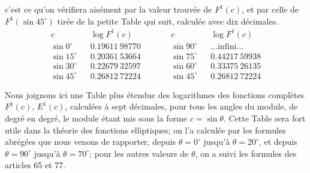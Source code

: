 \documentclass{article}
\begin{document}
c'est ce qu'on vérifiera aisément par la valeur trouvée de $F^{1}(c)$, et par celle de $F^{1}(\sin 45^{\circ})$ tirée de la petite Table qui suit, calculée avec dix décimales.
\[ \begin{aligned} c && \log F^{1}(c) &\qquad& c && \log F^{1}(c)\\ \sin 0^{\circ} && 0.19611\ 98770 && \sin 90^{\circ} && \ldots\text{infini}\ldots\\ \sin 15^{\circ} && 0.20361\ 53664 && \sin 75^{\circ} && 0.44217\ 59938\\ \sin 30^{\circ} && 0.22679\ 32597 && \sin 60^{\circ} && 0.33375\ 26135\\ \sin 45^{\circ} && 0.26812\ 72224 && \sin 45^{\circ} && 0.26812\ 72224 \end{aligned} \]

Nous joignons ici une Table plus étendue des logarithmes des fonctions complètes $F^{1}(c)$, $E^{1}(c)$, calculées à sept décimales, pour tous les angles du module, de degré en degré, le module étant mis sous la forme $c=\sin\theta$. Cette Table sera fort utile dans la théorie des fonctions elliptiques; on l'a calculée par les formules abrégées que nous venons de rapporter, depuis $\theta=0^{\circ}$ jusqu'à $\theta=20^{\circ}$, et depuis $\theta=90^{\circ}$ jusqu'à $\theta=70^{\circ}$; pour les autres valeurs de $\theta$, on a suivi les formules des articles 65 et 77.
\end{document}
